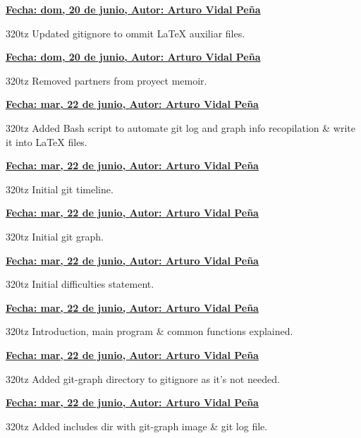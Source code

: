 \item \textbf{\underline{\underline{Fecha:} dom, 20 de junio, \underline{Autor:} Arturo Vidal Peña}}\\\item[]320tz Updated gitignore to ommit LaTeX auxiliar files.\\
\item \textbf{\underline{\underline{Fecha:} dom, 20 de junio, \underline{Autor:} Arturo Vidal Peña}}\\\item[]320tz Removed partners from proyect memoir.\\
\item \textbf{\underline{\underline{Fecha:} mar, 22 de junio, \underline{Autor:} Arturo Vidal Peña}}\\\item[]320tz Added Bash script to automate git log and graph info recopilation \& write it into LaTeX files.\\
\item \textbf{\underline{\underline{Fecha:} mar, 22 de junio, \underline{Autor:} Arturo Vidal Peña}}\\\item[]320tz Initial git timeline.\\
\item \textbf{\underline{\underline{Fecha:} mar, 22 de junio, \underline{Autor:} Arturo Vidal Peña}}\\\item[]320tz Initial git graph.\\
\item \textbf{\underline{\underline{Fecha:} mar, 22 de junio, \underline{Autor:} Arturo Vidal Peña}}\\\item[]320tz Initial difficulties statement.\\
\item \textbf{\underline{\underline{Fecha:} mar, 22 de junio, \underline{Autor:} Arturo Vidal Peña}}\\\item[]320tz Introduction, main program \& common functions explained.\\
\item \textbf{\underline{\underline{Fecha:} mar, 22 de junio, \underline{Autor:} Arturo Vidal Peña}}\\\item[]320tz Added git-graph directory to gitignore as it's not needed.\\
\item \textbf{\underline{\underline{Fecha:} mar, 22 de junio, \underline{Autor:} Arturo Vidal Peña}}\\\item[]320tz Added includes dir with git-graph image \& git log file.\\
